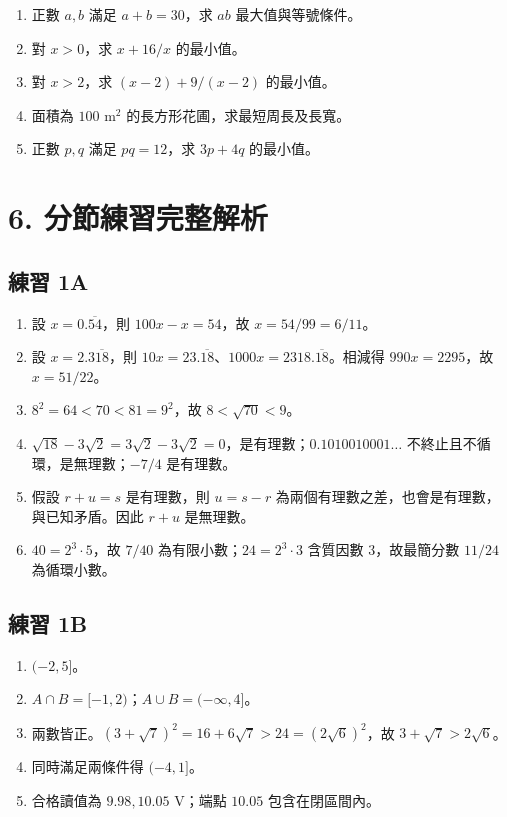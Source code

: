 \documentclass[11pt,a4paper]{article}
\providecommand{\tightlist}{%
  \setlength{\itemsep}{0pt}\setlength{\parskip}{0pt}}
\begin{document}
\begin{enumerate}
\def\labelenumi{\arabic{enumi}.}
\tightlist
\item
  正數 \(a,b\) 滿足 \(a+b=30\)，求 \(ab\) 最大值與等號條件。
\item
  對 \(x>0\)，求 \(x+16/x\) 的最小值。
\item
  對 \(x>2\)，求 \((x-2)+9/(x-2)\) 的最小值。
\item
  面積為 \(100\text{ m}^2\) 的長方形花圃，求最短周長及長寬。
\item
  正數 \(p,q\) 滿足 \(pq=12\)，求 \(3p+4q\) 的最小值。
\end{enumerate}

\section{6. 分節練習完整解析}\label{ux5206ux7bc0ux7df4ux7fd2ux5b8cux6574ux89e3ux6790}

\subsection{練習 1A}\label{ux7df4ux7fd2-1a-1}

\begin{enumerate}
\def\labelenumi{\arabic{enumi}.}
\tightlist
\item
  設 \(x=0.\overline{54}\)，則 \(100x-x=54\)，故 \(x=54/99=\boxed{6/11}\)。
\item
  設 \(x=2.3\overline{18}\)，則 \(10x=23.\overline{18}\)、\(1000x=2318.\overline{18}\)。相減得 \(990x=2295\)，故 \(x=\boxed{51/22}\)。
\item
  \(8^2=64<70<81=9^2\)，故 \(\boxed{8<\sqrt{70}<9}\)。
\item
  \(\sqrt{18}-3\sqrt2=3\sqrt2-3\sqrt2=0\)，是有理數；\(0.1010010001\ldots\) 不終止且不循環，是無理數；\(-7/4\) 是有理數。
\item
  假設 \(r+u=s\) 是有理數，則 \(u=s-r\) 為兩個有理數之差，也會是有理數，與已知矛盾。因此 \(r+u\) 是無理數。
\item
  \(40=2^3\cdot5\)，故 \(7/40\) 為有限小數；\(24=2^3\cdot3\) 含質因數 \(3\)，故最簡分數 \(11/24\) 為循環小數。
\end{enumerate}

\subsection{練習 1B}\label{ux7df4ux7fd2-1b-1}

\begin{enumerate}
\def\labelenumi{\arabic{enumi}.}
\tightlist
\item
  \(\boxed{(-2,5]}\)。
\item
  \(A\cap B=\boxed{[-1,2)}\)；\(A\cup B=\boxed{(-\infty,4]}\)。
\item
  兩數皆正。\((3+\sqrt7)^2=16+6\sqrt7>24=(2\sqrt6)^2\)，故 \(\boxed{3+\sqrt7>2\sqrt6}\)。
\item
  同時滿足兩條件得 \(\boxed{(-4,1]}\)。
\item
  合格讀值為 \(\boxed{9.98,10.05}\) V；端點 \(10.05\) 包含在閉區間內。
\end{enumerate}
\end{document}
